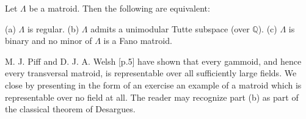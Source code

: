 Let $\Lambda$ be a matroid. Then the following are equivalent:

(a) $\Lambda$ is regular.
(b) $\Lambda$ admits a unimodular Tutte subspace (over $\mathbb{Q}$).
(c) $\Lambda$ is binary and no minor of $\Lambda$ is a Fano matroid.

M. J. Piff and D. J. A. Welsh [p.5] have shown that every gammoid, and hence every transversal matroid, is representable over all sufficiently large fields. We close by presenting in the form of an exercise an example of a matroid which is representable over no field at all. The reader may recognize part (b) as part of the classical theorem of Desargues.

